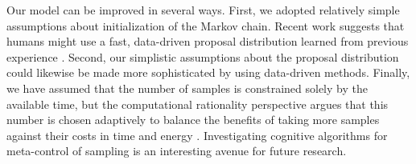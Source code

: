 
Our model can be improved in several ways. First, we adopted relatively simple assumptions about initialization of the Markov chain. Recent work suggests that humans might use a fast, data-driven proposal distribution learned from previous experience \citep{Yildirim,Gershman2014b}. Second, our simplistic assumptions about the proposal distribution could likewise be made more sophisticated by using data-driven methods. Finally, we have assumed that the number of samples is constrained solely by the available time, but the computational rationality perspective argues that this number is chosen adaptively to balance the benefits of taking more samples against their costs in time and energy \citep{Gershman2015,Vul2014,griffiths2015}. Investigating cognitive algorithms for meta-control of sampling is an interesting avenue for future research.

